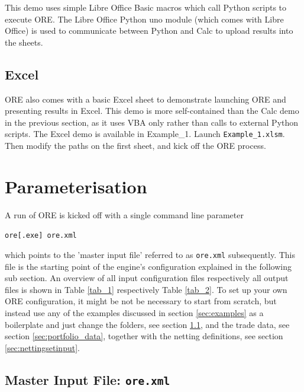 \documentclass[12pt, a4paper]{article}
\begin{document}
This demo uses simple Libre Office Basic macros which call Python scripts to execute ORE. The Libre Office Python uno
module (which comes with Libre Office) is used to communicate between Python and Calc to upload results into the sheets.


\subsection{Excel}\label{sec:excel}

ORE also comes with a basic Excel sheet to demonstrate launching ORE and presenting results in Excel. This demo is more
self-contained than the Calc demo in the previous section, as it uses VBA only rather than calls to external Python
scripts. The Excel demo is available in Example\_1. Launch {\tt Example\_1.xlsm}. Then modify the paths on the first
sheet, and kick off the ORE process.

\section{Parameterisation}\label{sec:configuration}

A run of ORE is kicked off with a single command line parameter 

\medskip
\centerline{\tt ore[.exe] ore.xml}
\medskip

which points to the 'master input file' referred to  as {\tt ore.xml} subsequently. 
This file is the starting point of the engine's configuration explained in the following sub section.
An overview of all input configuration files respectively all output files is shown in Table \ref{tab_1} respectively Table \ref{tab_2}.
To set up your own ORE configuration, it might be not be necessary to start from scratch, but instead use any of the examples discussed in section \ref{sec:examples} as a boilerplate and just change the folders, see section \ref{sec:master_input}, and the trade data, see section \ref{sec:portfolio_data}, together with the netting definitions, see section \ref{sec:nettingsetinput}.

\subsection{Master Input File: {\tt ore.xml}}\label{sec:master_input}
\end{document}

